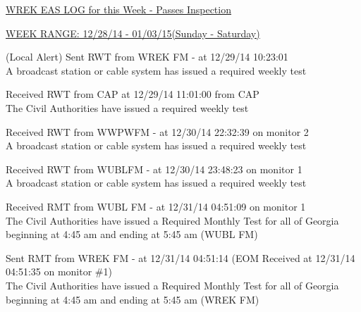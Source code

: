 \documentclass{article}
\begin{document}
\noindent \underline{\underline{WREK EAS LOG for this Week - Passes Inspection}} 

\medskip

\noindent \underline{WEEK RANGE: 12/28/14 - 01/03/15(Sunday - Saturday)}

\medskip

\hspace{20 pt}     (Local Alert) Sent RWT from WREK FM - at 12/29/14 10:23:01\\\hspace{20pt}     A broadcast station or cable system has issued a required weekly test

\medskip

\hspace{20 pt}     Received RWT from CAP at 12/29/14 11:01:00 from CAP \\\hspace{20pt}     The Civil Authorities have issued a required weekly test

\medskip

\hspace{20 pt}     Received RWT from WWPWFM - at 12/30/14 22:32:39 on monitor 2\\\hspace{20pt}     A broadcast station or cable system has issued a required weekly test

\medskip

\hspace{20 pt}     Received RWT from WUBLFM - at 12/30/14 23:48:23 on monitor 1\\\hspace{20pt}     A broadcast station or cable system has issued a required weekly test

\medskip

\hspace{20 pt}     Received RMT from WUBL FM - at 12/31/14 04:51:09 on monitor 1\\      The Civil Authorities have issued a Required Monthly Test for all of Georgia beginning at 4:45 am and ending at 5:45 am (WUBL FM) 

\medskip

\hspace{20 pt}     Sent RMT from WREK FM - at 12/31/14 04:51:14 (EOM Received at 12/31/14 04:51:35 on monitor \#1) \\      The Civil Authorities have issued a Required Monthly Test for all of Georgia beginning at 4:45 am and ending at 5:45 am (WREK FM) 

\medskip
\end{document}
